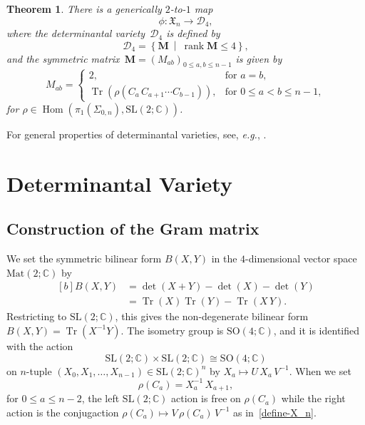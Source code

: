 \documentclass[12pt,reqno]{amsart}
\newtheorem{theorem}{Theorem}[]
\DeclareMathOperator{\rank}{rank}
\DeclareMathOperator{\Tr}{Tr}
\DeclareMathOperator{\Hom}{Hom}
\begin{document}
\begin{theorem}
  There is a generically $2$-to-$1$ map
  \begin{equation*}
    \phi: \mathfrak{X}_n \to \mathcal{D}_4 ,
  \end{equation*}
  where the
  determinantal variety~$\mathcal{D}_4$ is defined by
  \begin{equation}
    \label{d4_variety}
    \mathcal{D}_4
    =
    \left\{
      \mathbf{M}
      ~\middle|~
      \rank \mathbf{M} \leq 4
    \right\} ,
  \end{equation}
  and  the symmetric
  matrix~$\mathbf{M}=(M_{a b})_{0 \leq a,b \leq   n-1}$
  is  given by
  \begin{equation*}
    M_{a b}
    =
    \begin{cases}
      2, & \text{for $a=b$},
      \\[4pt]
      \Tr\left(
      \rho(C_a  \, C_{a+1}\cdots C_{b-1})
      \right),
         &
           \text{for $0\leq a<b \leq n-1$},
    \end{cases}
  \end{equation*}
  for $\rho\in \Hom(\pi_1(\Sigma_{0,n}), \mathrm{SL}(2;\mathbb{C}))$.
\end{theorem}
For general properties of determinantal varieties,
see, \emph{e.g.}, \cite{BrunsVette88Book,Dolga12Book}.






\section{Determinantal Variety}
\subsection{Construction of the Gram matrix}

We set
the symmetric  bilinear form  $B(X,Y)$
in the $4$-dimensional vector space $\mathrm{Mat}(2;\mathbb{C})$
by
\begin{equation}
  \label{eq:2}
  \begin{aligned}[b]
    B(X,Y)
    & =
      \det(X+Y)-\det(X)-\det(Y)
    \\
    & =
      \Tr(X) \Tr(Y)-\Tr(X \, Y) .
  \end{aligned}
\end{equation}
Restricting to $\mathrm{SL}(2;\mathbb{C})$,
this gives the non-degenerate bilinear form~$B(X,Y)=\Tr (X^{-1} Y)$.
The isometry group  is $\mathrm{SO}(4;\mathbb{C})$,
and
it  is identified with
the action
\begin{equation*}
\mathrm{SL}(2;\mathbb{C}) \times \mathrm{SL}(2;\mathbb{C})
\cong \mathrm{SO}(4;\mathbb{C}) 
\end{equation*}
on  $n$-tuple $(X_0, X_1, \dots, X_{n-1}) \in \mathrm{SL}(2;\mathbb{C})^n$ by
$X_a \mapsto U \, X_a \, V^{-1}$.
When we set
\begin{equation}
  \rho(C_{a}) =  X_a^{-1} \,  X_{a+1},
\end{equation}
for $0 \leq a \leq n-2$,
the left $\mathrm{SL}(2;\mathbb{C})$ action is free on
$\rho(C_a)$
while the right
action is the conjugaction
$\rho(C_a) \mapsto V \, \rho(C_a) \, V^{-1}$
as in~\eqref{define-X_n}.
\end{document}
